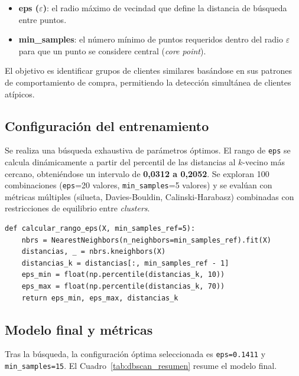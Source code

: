 \documentclass[11pt,a4paper]{article}
\begin{document}
\begin{itemize}
    \item \textbf{eps ($\varepsilon$)}: el radio máximo de vecindad que define la distancia de búsqueda entre puntos.
    \item \textbf{min\_samples}: el número mínimo de puntos requeridos dentro del radio $\varepsilon$ para que un punto se considere central (\textit{core point}).
\end{itemize}

El objetivo es identificar grupos de clientes similares basándose en sus patrones de comportamiento de compra, permitiendo la detección simultánea de clientes atípicos.

\subsection{Configuración del entrenamiento}

Se realiza una búsqueda exhaustiva de parámetros óptimos. El rango de \texttt{eps} se calcula dinámicamente a partir del percentil de las distancias al $k$-vecino más cercano, obteniéndose un intervalo de \textbf{0,0312 a 0,2052}. Se exploran 100 combinaciones (\texttt{eps}=20 valores, \texttt{min\_samples}=5 valores) y se evalúan con métricas múltiples (silueta, Davies-Bouldin, Calinski-Harabasz) combinadas con restricciones de equilibrio entre \textit{clusters}.

\begin{lstlisting}
def calcular_rango_eps(X, min_samples_ref=5):
    nbrs = NearestNeighbors(n_neighbors=min_samples_ref).fit(X)
    distancias, _ = nbrs.kneighbors(X)
    distancias_k = distancias[:, min_samples_ref - 1]
    eps_min = float(np.percentile(distancias_k, 10))
    eps_max = float(np.percentile(distancias_k, 70))
    return eps_min, eps_max, distancias_k
\end{lstlisting}

\subsection{Modelo final y métricas}

Tras la búsqueda, la configuración óptima seleccionada es \texttt{eps=0.1411} y \texttt{min\_samples=15}. El Cuadro~\ref{tab:dbscan_resumen} resume el modelo final.
\end{document}
